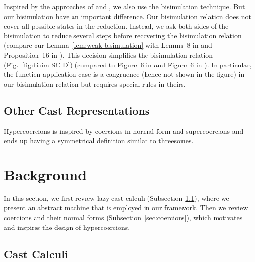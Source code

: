 \documentclass[runningheads]{llncs}
\begin{document}
Inspired by the approaches of \cite{Siek:2010:TWB:1706299.1706342} and
\cite{Siek:2015:BCT:2737924.2737968}, we also use the bisimulation
technique. But our bisimulation have an important difference. Our
bisimulation relation does not cover all possible states in the
reduction. Instead, we ask both sides of the bisimulation to reduce
several steps before recovering the bisimulation relation (compare our
Lemma~\ref{lem:weak-bisimulation} with Lemma~8 in
\cite{Siek:2010:TWB:1706299.1706342} and Proposition~16 in
\cite{Siek:2015:BCT:2737924.2737968}).  This decision simplifies the
bisimulation relation (Fig.~\ref{fig:bisim-SC-D}) (compared to
Figure~6 in \cite{Siek:2010:TWB:1706299.1706342} and Figure~6 in
\cite{Siek:2015:BCT:2737924.2737968}).  In particular, the function
application case is a congruence (hence not shown in the figure) in
our bisimulation relation but requires special rules in theirs.

\subsection{Other Cast Representations}
\label{subsec:related-work-other-cast-reprs}

Hypercoercions is inspired by coercions in normal form and supercoercions
and ends up having a symmetrical definition similar to threesomes.

\section{Background} \label{sec:background}

In this section, we first review lazy cast calculi (Subsection~\ref{sec:cast-calculi}), where
we present an abstract machine that is employed in our framework. Then
we review coercions and their normal forms (Subsection~\ref{sec:coercions}), which
motivates and inspires the design of hypercoercions.

\subsection{Cast Calculi} \label{sec:cast-calculi}
\end{document}
